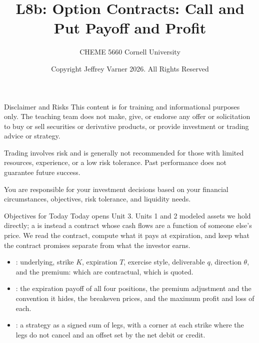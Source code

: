 \documentclass[aspectratio=169,11pt]{beamer}
\title{\texorpdfstring{{\vnheavy L8b}}{L8b}: Option Contracts: Call and Put Payoff and Profit}
\subtitle{CHEME 5660 Cornell University}
\author{Copyright Jeffrey Varner 2026. All Rights Reserved}
\begin{document}
\vntitlepage

\begin{frame}{Disclaimer and Risks}
  \vspace{0.6em}
  \textbf{} This content is for training and informational
  purposes only. The teaching team does not make, give, or endorse any offer or
  solicitation to buy or sell securities or derivative products, or provide
  investment or trading advice or strategy.

  \vspace{1.1em}
  \textbf{} Trading involves risk and is generally not recommended for
  those with limited resources, experience, or a low risk tolerance. Past
  performance does not guarantee future success.

  \vspace{1.1em}
  \textbf{} You are responsible for your investment decisions
  based on your financial circumstances, objectives, risk tolerance, and
  liquidity needs.
\end{frame}

\begin{frame}{Objectives for Today}
  Today opens Unit 3. Units 1 and 2 modeled assets we hold directly; a
   is instead a contract whose cash flows are a function of
  someone else's price. We read the contract, compute what it pays at
  expiration, and keep what the contract promises separate from what the
  investor earns.

  \vspace{0.5em}
  {\large\textbf{}}
  \vspace{0.2em}
  \begin{itemize}\setlength{\itemsep}{0.4em}
    \item {}: underlying, strike $K$, expiration
      $T$, exercise style, deliverable $q$, direction $\theta$, and the premium:
      which are contractual, which is quoted.
    \item {}: the expiration payoff of all four
      positions, the premium adjustment and the convention it hides, the
      breakeven prices, and the maximum profit and loss of each.
    \item {}: a strategy as a signed sum of legs, with a
      corner at each strike where the legs do not cancel and an offset set by
      the net debit or credit.
  \end{itemize}
\end{frame}
\end{document}
